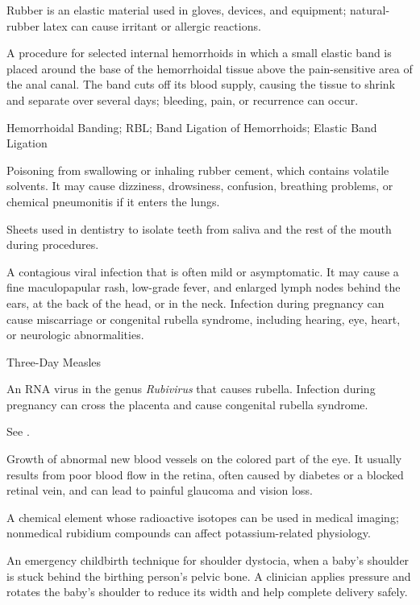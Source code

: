  Rubber is an elastic material used in gloves, devices, and equipment; natural-rubber latex can cause irritant or allergic reactions.

 A procedure for selected internal hemorrhoids in which a small elastic band is placed around the base of the hemorrhoidal tissue above the pain-sensitive area of the anal canal. The band cuts off its blood supply, causing the tissue to shrink and separate over several days; bleeding, pain, or recurrence can occur.

\synonyms
Hemorrhoidal Banding; RBL; Band Ligation of Hemorrhoids; Elastic Band Ligation

 Poisoning from swallowing or inhaling rubber cement, which contains volatile solvents. It may cause dizziness, drowsiness, confusion, breathing problems, or chemical pneumonitis if it enters the lungs.

 Sheets used in dentistry to isolate teeth from saliva and the rest of the mouth during procedures.

 A contagious viral infection that is often mild or asymptomatic. It may cause a fine maculopapular rash, low-grade fever, and enlarged lymph nodes behind the ears, at the back of the head, or in the neck. Infection during pregnancy can cause miscarriage or congenital rubella syndrome, including hearing, eye, heart, or neurologic abnormalities.

\synonyms
Three-Day Measles

 An RNA virus in the genus \textit{Rubivirus} that causes rubella. Infection during pregnancy can cross the placenta and cause congenital rubella syndrome.

 See .

 Growth of abnormal new blood vessels on the colored part of the eye. It usually results from poor blood flow in the retina, often caused by diabetes or a blocked retinal vein, and can lead to painful glaucoma and vision loss.

 A chemical element whose radioactive isotopes can be used in medical imaging; nonmedical rubidium compounds can affect potassium-related physiology.

 An emergency childbirth technique for shoulder dystocia, when a baby’s shoulder is stuck behind the birthing person’s pelvic bone. A clinician applies pressure and rotates the baby’s shoulder to reduce its width and help complete delivery safely.

